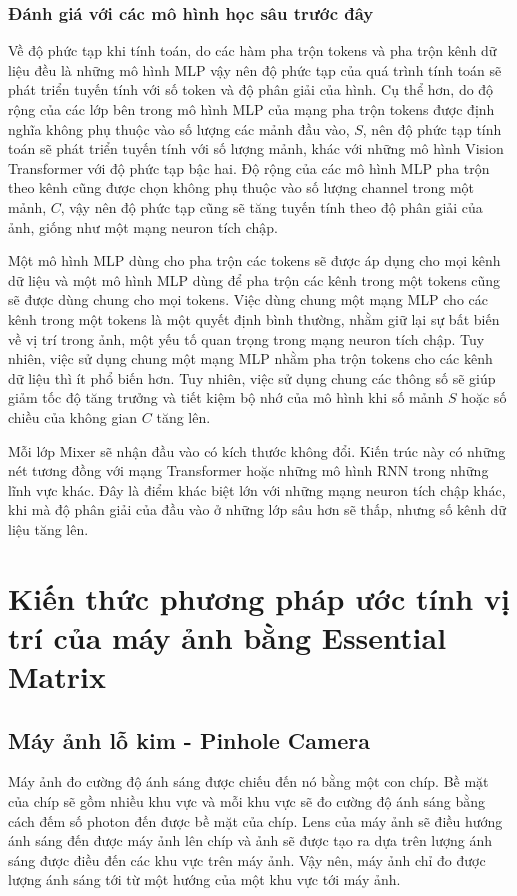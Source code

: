 \subsubsection*{Đánh giá với các mô hình học sâu trước đây}
Về độ phức tạp khi tính toán, do các hàm pha trộn tokens và pha trộn kênh dữ liệu đều là những mô hình MLP vậy nên độ phức tạp của quá trình tính toán sẽ phát triển tuyến tính với số token và độ phân giải của hình. Cụ thể hơn, do độ rộng của các lớp bên trong mô hình MLP của mạng pha trộn tokens được định nghĩa không phụ thuộc vào số lượng các mảnh đầu vào, $S$, nên độ phức tạp tính toán sẽ phát triển tuyến tính với số lượng mảnh, khác với những mô hình Vision Transformer với độ phức tạp bậc hai. Độ rộng của các mô hình MLP pha trộn theo kênh cũng được chọn không phụ thuộc vào số lượng channel trong một mảnh, $C$, vậy nên độ phức tạp cũng sẽ tăng tuyến tính theo độ phân giải của ảnh, giống như một mạng neuron tích chập.

Một mô hình MLP dùng cho pha trộn các tokens sẽ được áp dụng cho mọi kênh dữ liệu và một mô hình MLP dùng để pha trộn các kênh trong một tokens cũng sẽ được dùng chung cho mọi tokens. Việc dùng chung một mạng MLP cho các kênh trong một tokens là một quyết định bình thường, nhằm giữ lại sự bất biến về vị trí trong ảnh, một yếu tố quan trọng trong mạng neuron tích chập. Tuy nhiên, việc sử dụng chung một mạng MLP nhằm pha trộn tokens cho các kênh dữ liệu thì ít phổ biến hơn. Tuy nhiên, việc sử dụng chung các thông số sẽ giúp giảm tốc độ tăng trưởng và tiết kiệm bộ nhớ của mô hình khi số mảnh $S$ hoặc số chiều của không gian $C$ tăng lên.

Mỗi lớp Mixer sẽ nhận đầu vào có kích thước không đổi. Kiến trúc này có những nét tương đồng với mạng Transformer hoặc những mô hình RNN trong những lĩnh vực khác. Đây là điểm khác biệt lớn với những mạng neuron tích chập khác, khi mà độ phân giải của đầu vào ở những lớp sâu hơn sẽ thấp, nhưng số kênh dữ liệu tăng lên.


\section{Kiến thức phương pháp ước tính vị trí của máy ảnh bằng Essential Matrix}
\subsection{Máy ảnh lỗ kim - Pinhole Camera}
Máy ảnh đo cường độ ánh sáng được chiếu đến nó bằng một con chíp. Bề mặt của chíp sẽ gồm nhiều khu vực và mỗi khu vực sẽ đo cường độ ánh sáng bằng cách đếm số photon đến được bề mặt của chíp. Lens của máy ảnh sẽ điều hướng ánh sáng đến được máy ảnh lên chíp và ảnh sẽ được tạo ra dựa trên lượng ánh sáng được điều đến các khu vực trên máy ảnh. Vậy nên, máy ảnh chỉ đo được lượng ánh sáng tới từ một hướng của một khu vực tới máy ảnh.


